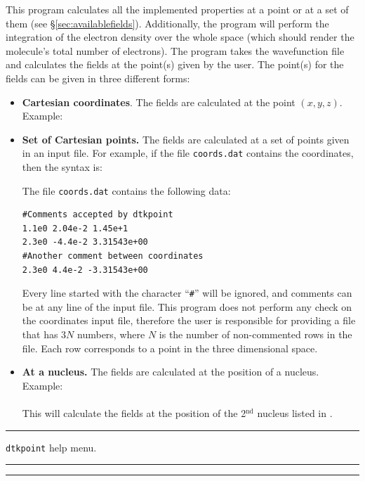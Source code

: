 This program calculates all the implemented properties at a point or at a set of them (see \S \ref{sec:availablefields}). Additionally, the program will perform the integration of the electron density over the whole space (which should render the molecule's total number of electrons). The program takes the wavefunction file and calculates the fields at the point(s) given by the user. The point(s) for the fields can be given in three different forms:
\begin{itemize}
   \item \textbf{Cartesian coordinates}. The fields are calculated at the point $(x,y,z)$. Example:\\
   \item \textbf{Set of Cartesian points.} The fields are calculated at a set of points given in an input file. For example, if the file \texttt{coords.dat} contains the coordinates, then the syntax is:\\
      
      The file \texttt{coords.dat} contains the following data:
      \begin{verbatim}
#Comments accepted by dtkpoint
1.1e0 2.04e-2 1.45e+1
2.3e0 -4.4e-2 3.31543e+00
#Another comment between coordinates
2.3e0 4.4e-2 -3.31543e+00
      \end{verbatim}
      Every line started with the character ``\texttt{\#}'' will be ignored, and comments can be at any line of the input file. This program does not perform any check on the coordinates input file, therefore the user is responsible for providing a file that has $3N$ numbers, where $N$ is the number of non-commented rows in the file. Each row corresponds to a point in the three dimensional space.
      \item \textbf{At a nucleus.} The fields are calculated at the position of a nucleus. Example:\\
         \\
   This will calculate the fields at the position of the 2$^{\textrm{nd}}$ nucleus listed in \wfexfile.
\end{itemize}


\rule{\textwidth}{1pt}
{\center\texttt{dtkpoint} help menu.\\}
\rule{\textwidth}{1pt}
\begin{small}
\end{small}
\rule{\textwidth}{1pt}

